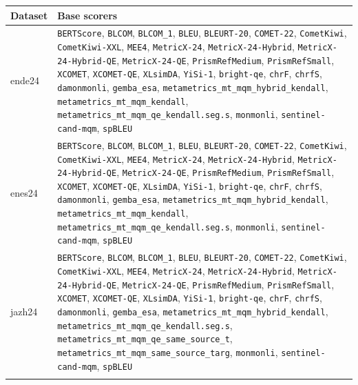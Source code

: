 \documentclass[11pt]{article}
\begin{document}
\begin{table}[t]
\centering
\footnotesize
\begin{tabular}{l p{}}
\toprule
Dataset & Base scorers \\
\midrule
ende24 & \texttt{BERTScore}, \texttt{BLCOM}, \texttt{BLCOM\_1}, \texttt{BLEU}, \texttt{BLEURT-20}, \texttt{COMET-22}, \texttt{CometKiwi}, \texttt{CometKiwi-XXL}, \texttt{MEE4}, \texttt{MetricX-24}, \texttt{MetricX-24-Hybrid}, \texttt{MetricX-24-Hybrid-QE}, \texttt{MetricX-24-QE}, \texttt{PrismRefMedium}, \texttt{PrismRefSmall}, \texttt{XCOMET}, \texttt{XCOMET-QE}, \texttt{XLsimDA}, \texttt{YiSi-1}, \texttt{bright-qe}, \texttt{chrF}, \texttt{chrfS}, \texttt{damonmonli}, \texttt{gemba\_esa}, \texttt{metametrics\_mt\_mqm\_hybrid\_kendall}, \texttt{metametrics\_mt\_mqm\_kendall}, \texttt{metametrics\_mt\_mqm\_qe\_kendall.seg.s}, \texttt{monmonli}, \texttt{sentinel-cand-mqm}, \texttt{spBLEU} \\
\addlinespace
enes24 & \texttt{BERTScore}, \texttt{BLCOM}, \texttt{BLCOM\_1}, \texttt{BLEU}, \texttt{BLEURT-20}, \texttt{COMET-22}, \texttt{CometKiwi}, \texttt{CometKiwi-XXL}, \texttt{MEE4}, \texttt{MetricX-24}, \texttt{MetricX-24-Hybrid}, \texttt{MetricX-24-Hybrid-QE}, \texttt{MetricX-24-QE}, \texttt{PrismRefMedium}, \texttt{PrismRefSmall}, \texttt{XCOMET}, \texttt{XCOMET-QE}, \texttt{XLsimDA}, \texttt{YiSi-1}, \texttt{bright-qe}, \texttt{chrF}, \texttt{chrfS}, \texttt{damonmonli}, \texttt{gemba\_esa}, \texttt{metametrics\_mt\_mqm\_hybrid\_kendall}, \texttt{metametrics\_mt\_mqm\_kendall}, \texttt{metametrics\_mt\_mqm\_qe\_kendall.seg.s}, \texttt{monmonli}, \texttt{sentinel-cand-mqm}, \texttt{spBLEU} \\
\addlinespace
jazh24 & \texttt{BERTScore}, \texttt{BLCOM}, \texttt{BLCOM\_1}, \texttt{BLEU}, \texttt{BLEURT-20}, \texttt{COMET-22}, \texttt{CometKiwi}, \texttt{CometKiwi-XXL}, \texttt{MEE4}, \texttt{MetricX-24}, \texttt{MetricX-24-Hybrid}, \texttt{MetricX-24-Hybrid-QE}, \texttt{MetricX-24-QE}, \texttt{PrismRefMedium}, \texttt{PrismRefSmall}, \texttt{XCOMET}, \texttt{XCOMET-QE}, \texttt{XLsimDA}, \texttt{YiSi-1}, \texttt{bright-qe}, \texttt{chrF}, \texttt{chrfS}, \texttt{damonmonli}, \texttt{gemba\_esa}, \texttt{metametrics\_mt\_mqm\_hybrid\_kendall}, \texttt{metametrics\_mt\_mqm\_qe\_kendall.seg.s}, \texttt{metametrics\_mt\_mqm\_qe\_same\_source\_t}, \texttt{metametrics\_mt\_mqm\_same\_source\_targ}, \texttt{monmonli}, \texttt{sentinel-cand-mqm}, \texttt{spBLEU} \\
\addlinespace

\end{tabular}
\end{table}
\end{document}
